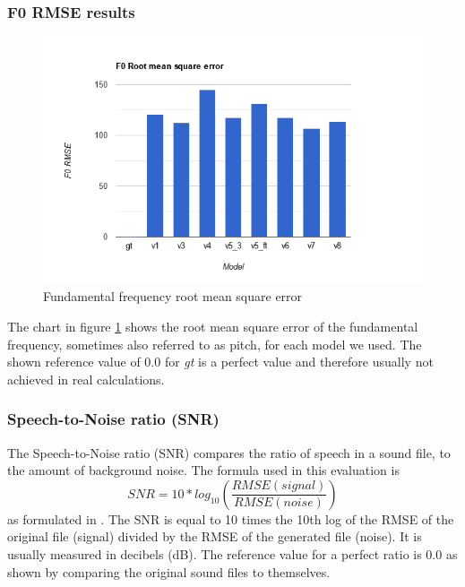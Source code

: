 \documentclass[a4paper]{article}
\begin{document}
	\subsubsection{F0 RMSE results}
	\begin{figure}[hbtp]
		\includegraphics[width=\textwidth]{evaluation/graphs/F0RMSE.png}
		\caption{Fundamental frequency root mean square error}
		\label{fig:f0rmse_results}
	\end{figure}
	
	The chart in figure \ref{fig:f0rmse_results} shows the root mean square error of
	the fundamental frequency, sometimes also referred to as pitch, for each model
	we used. The shown reference value of 0.0 for \emph{gt} is a perfect value and
	therefore usually not achieved in real calculations.
	
	\subsubsection{Speech-to-Noise ratio (SNR)}
	The Speech-to-Noise ratio (SNR) compares the ratio of speech in a sound file, to
	the amount of background noise. The formula used in this evaluation is \\
	\[
	SNR = 10*log_{10} (\frac{RMSE(signal)}{RMSE(noise)})
	\]
	as formulated in \cite{ji2020comprehensivesurveydeepmusic}. The SNR is equal to 10 times the 10th log of the RMSE of
	the original file (signal) divided by the RMSE of the generated file (noise). It
	is usually measured in decibels (dB). The reference value for a perfect ratio is
	0.0 as shown by comparing the original sound files to themselves.
	
\end{document}
